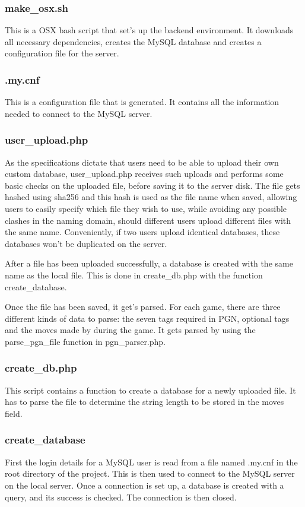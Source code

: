 \documentclass{article}
\begin{document}
\subsubsection{make\_osx.sh}
This is a OSX bash script that set's up the backend environment. It downloads all necessary dependencies, creates the MySQL database and creates a configuration file for the server.

\subsubsection{.my.cnf}
This is a configuration file that is generated. It contains all the information needed to connect to the MySQL server.

\subsubsection{user\_upload.php}
As the specifications dictate that users need to be able to upload their own custom database, user\_upload.php receives such uploads and performs some basic checks on the uploaded file, before saving it to the server disk.  The file gets hashed using sha256 and this hash is used as the file name when saved, allowing users to easily specify which file they wish to use, while avoiding any possible clashes in the naming domain, should different users upload different files with the same name.  Conveniently, if two users upload identical databases, these databases won't be duplicated on the server.

After a file has been uploaded successfully, a database is created with the same name as the local file.  This is done in create\_db.php with the function create\_database.

Once the file has been saved, it get's parsed. For each game, there are three different kinds of data to parse:  the seven tags required in PGN, optional tags and the moves made by during the game.  It gets parsed by using the parse\_pgn\_file function in pgn\_parser.php.


\subsubsection{create\_db.php}
This script contains a function to create a database for a newly uploaded file. It has to parse the file to determine the string length to be stored in the moves field.

\subsubsection*{create\_database}
First the login details for a MySQL user is read from a file named .my.cnf in the root directory of the project.  This is then used to connect to the MySQL server on the local server.  Once a connection is set up, a database is created with a query, and its success is checked.  The connection is then closed.
\end{document}
